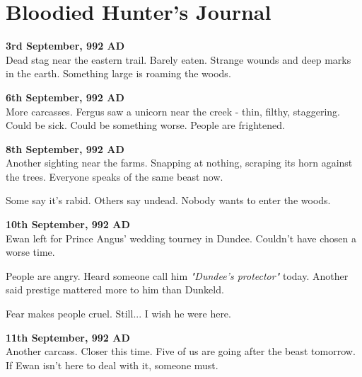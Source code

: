 \onecolumn
\chapter*{Bloodied Hunter's Journal}\label{resource:BloodiedHuntersJournal}
\begin{LeatherBoundJournal}[bloodied, font=\notefont, fontsize=12pt]
{\entryfont\textbf{3rd September, 992 AD}}\\
Dead stag near the eastern trail. Barely eaten. Strange wounds and deep marks in the earth. Something large is roaming the woods.\\\vspace*{\fontdimen6\font}

{\entryfont\textbf{6th September, 992 AD}}\\
More carcasses. Fergus saw a unicorn near the creek - thin, filthy, staggering. Could be sick. Could be something worse. People are frightened.\\\vspace*{\fontdimen6\font}

{\entryfont\textbf{8th September, 992 AD}}\\
Another sighting near the farms. Snapping at nothing, scraping its horn against the trees. Everyone speaks of the same beast now.

Some say it's rabid. Others say undead. Nobody wants to enter the woods.\\\vspace*{\fontdimen6\font}

{\entryfont\textbf{10th September, 992 AD}}\\
Ewan left for Prince Angus' wedding tourney in Dundee. Couldn't have chosen a worse time.

People are angry. Heard someone call him \textit{"Dundee's protector"} today. Another said prestige mattered more to him than Dunkeld.

Fear makes people cruel. Still... I wish he were here.\\\vspace*{\fontdimen6\font}

{\entryfont\textbf{11th September, 992 AD}}\\
Another carcass. Closer this time. Five of us are going after the beast tomorrow. If Ewan isn't here to deal with it, someone must.\\\vspace*{\fontdimen6\font}


\end{LeatherBoundJournal}
